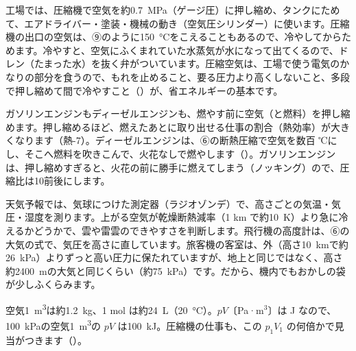 \begin{phkougaku}
工場では、圧縮機で空気を約\qty{0.7}{MPa}（ゲージ圧）に押し縮め、タンクにためて、エアドライバー・塗装・機械の動き（空気圧シリンダー）に使います。圧縮機の出口の空気は、⑨のように\qty{150}{\celsius}をこえることもあるので、冷やしてからためます。冷やすと、空気にふくまれていた水蒸気が水になって出てくるので、ドレン（たまった水）を抜く弁がついています。圧縮空気は、工場で使う電気のかなりの部分を食うので、もれを止めること、要る圧力より高くしないこと、多段で押し縮めて間で冷やすこと（）が、省エネルギーの基本です。

ガソリンエンジンもディーゼルエンジンも、燃やす前に空気（と燃料）を押し縮めます。押し縮めるほど、燃えたあとに取り出せる仕事の割合（熱効率）が大きくなります（熱-7）。ディーゼルエンジンは、⑥の断熱圧縮で空気を数百 ℃にし、そこへ燃料を吹きこんで、火花なしで燃やします（）。ガソリンエンジンは、押し縮めすぎると、火花の前に勝手に燃えてしまう（ノッキング）ので、圧縮比は10前後にします。

天気予報では、気球につけた測定器（ラジオゾンデ）で、高さごとの気温・気圧・湿度を測ります。上がる空気が乾燥断熱減率（1 km で約\qty{10}{K}）より急に冷えるかどうかで、雲や雷雲のできやすさを判断します。飛行機の高度計は、⑥の大気の式で、気圧を高さに直しています。旅客機の客室は、外（高さ\qty{10}{km}で約\qty{26}{kPa}）よりずっと高い圧力に保たれていますが、地上と同じではなく、高さ約\qty{2400}{m}の大気と同じくらい（約\qty{75}{kPa}）です。だから、機内でもおかしの袋が少しふくらみます。

\begin{phketa}
空気\qty{1}{m^3}は約\qty{1.2}{kg}、1 mol は約\qty{24}{L}（\qty{20}{\celsius}）。$pV$〔Pa·m$^3$〕は J なので、\qty{100}{kPa}の空気\qty{1}{m^3}の $pV$ は\qty{100}{kJ}。圧縮機の仕事も、この $p_1V_1$ の何倍かで見当がつきます（）。
\end{phketa}
\end{phkougaku}

